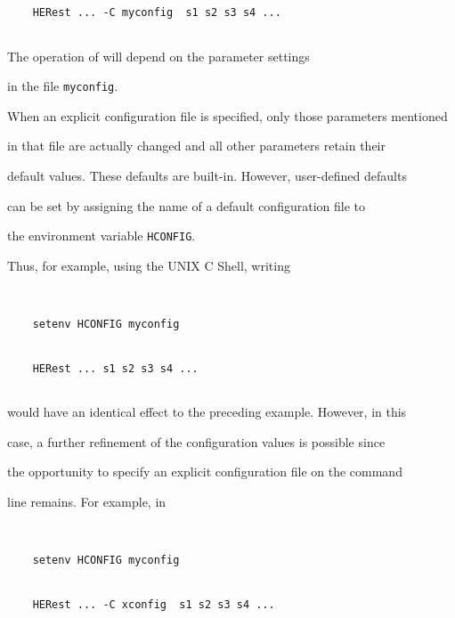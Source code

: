 \begin{verbatim}


    HERest ... -C myconfig  s1 s2 s3 s4 ...


\end{verbatim}


The operation of  will depend on the parameter settings


in the file \texttt{myconfig}.    





When an explicit configuration file is specified, only those parameters mentioned


in that file are actually changed and all other parameters retain their


default values.  These defaults are built-in.  However, user-defined defaults


can be set by assigning the name of a default configuration file to


the environment variable \texttt{HCONFIG}.




Thus, for example, using the UNIX C Shell, writing


\begin{verbatim}


    setenv HCONFIG myconfig


    HERest ... s1 s2 s3 s4 ...


\end{verbatim}


would have an identical effect to the preceding example.  However, in this


case, a further refinement of the configuration values is possible since


the opportunity to specify an explicit configuration file on the command


line remains.  For example, in


\begin{verbatim}


    setenv HCONFIG myconfig


    HERest ... -C xconfig  s1 s2 s3 s4 ...


\end{verbatim}







\noindent


